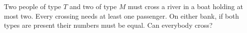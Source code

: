 Two people of type $T$ and two of type $M$ must cross a river in a boat holding at most two. Every crossing needs at least one passenger. On either bank, if both types are present their numbers must be equal. Can everybody cross?
